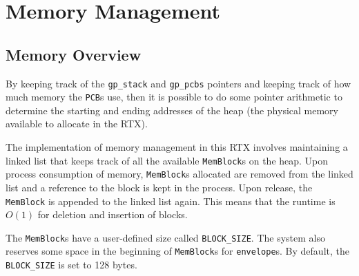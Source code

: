 \documentclass[12pt]{report}
\begin{document}
\section{Memory Management}

\subsection{Memory Overview}


By keeping track of the \texttt{gp_stack} and \texttt{gp_pcbs} pointers and keeping track of how much memory the \texttt{PCB}s use, then it is possible to do some pointer arithmetic to determine the starting and ending addresses of the heap (the physical memory available to allocate in the RTX).

The implementation of memory management in this RTX involves maintaining a linked list that keeps track of all the available \texttt{MemBlock}s on the heap. Upon process consumption of memory, \texttt{MemBlock}s allocated are removed from the linked list and a reference to the block is kept in the process. Upon release, the \texttt{MemBlock} is appended to the linked list again. This means that the runtime is $O(1)$ for deletion and insertion of blocks.

 The \texttt{MemBlock}s have a user-defined size called \texttt{BLOCK_SIZE}. The system also reserves some space in the beginning of \texttt{MemBlock}s for \texttt{envelope}s. By default, the \texttt{BLOCK_SIZE} is set to 128 bytes.
\end{document}
